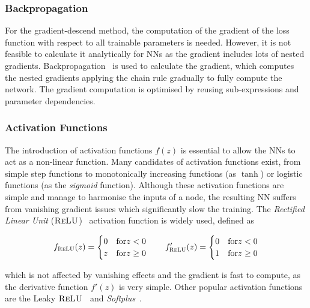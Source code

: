 \subsubsection{Backpropagation}

For the gradient-descend method, the computation of the gradient of the loss function with respect to all trainable parameters is needed. However, it is not feasible to calculate it analytically for NNs as the gradient includes lots of nested gradients. Backpropagation~\cite{Rumelhart1986} is used to calculate the gradient, which computes the nested gradients applying the chain rule gradually to fully compute the network. The gradient computation is optimised by reusing sub-expressions and parameter dependencies.

\subsubsection{Activation Functions}

The introduction of activation functions $f(z)$ is essential to allow the NNs to act as a non-linear function. Many candidates of activation functions exist, from simple step functions to monotonically increasing functions (as $\tanh$) or logistic functions (as the \textit{sigmoid} function). Although these activation functions are simple and manage to harmonise the inputs of a node, the resulting NN suffers from vanishing gradient issues which significantly slow the training. The \textit{Rectified Linear Unit} ($\textsc{ReLU}$)~\cite{relu} activation function is widely used, defined as

\begin{align}
    f_\textsc{ReLU}(z)= \begin{cases}
            0& \text{for}  z<0 \\
            z& \text{for}  z\geq0\\
            \end{cases}\qquad f'_\textsc{ReLU}(z)= \begin{cases}
                0& \text{for}  z<0 \\
                1& \text{for}  z\geq0\\
                \end{cases}
\end{align}

which is not affected by vanishing effects and the gradient is fast to compute, as the derivative function $f'(z)$ is very simple. Other popular activation functions are the Leaky $\textsc{ReLU}$~\cite{lrelu} and \textit{Softplus}~\cite{Maas2013RectifierNI}.\\

